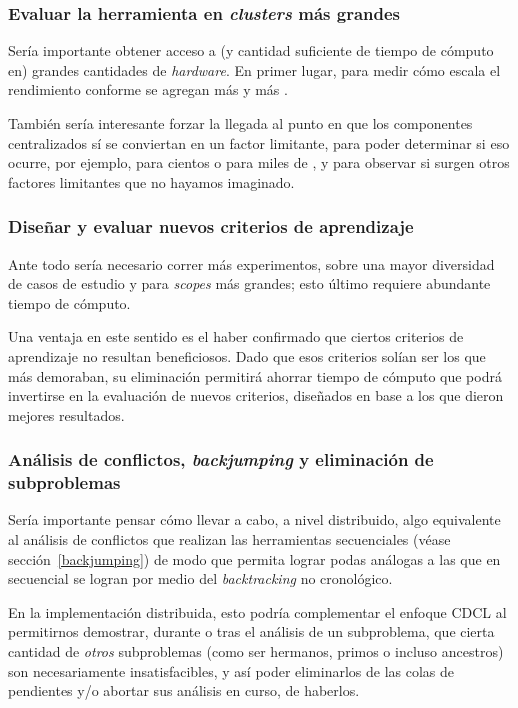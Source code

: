 \subsubsection{Evaluar la herramienta en \emph{clusters} más grandes}

Sería importante obtener acceso a (y cantidad suficiente de tiempo de cómputo en) grandes cantidades de \emph{hardware}. En primer lugar, para medir cómo escala el rendimiento conforme se agregan más y más \ws.

También sería interesante forzar la llegada al punto en que los componentes centralizados sí se conviertan en un factor limitante, para poder determinar si eso ocurre, por ejemplo, para cientos o para miles de \ws, y para observar si surgen otros factores limitantes que no hayamos imaginado.


\subsubsection{Diseñar y evaluar nuevos criterios de aprendizaje}

Ante todo sería necesario correr más experimentos, sobre una mayor diversidad de casos de estudio y para \emph{scopes} más grandes; esto último requiere abundante tiempo de cómputo.

Una ventaja en este sentido es el haber confirmado que ciertos criterios de aprendizaje no resultan beneficiosos. Dado que esos criterios solían ser los que más demoraban, su eliminación permitirá ahorrar tiempo de cómputo que podrá invertirse en la evaluación de nuevos criterios, diseñados en base a los que dieron mejores resultados.


\subsubsection{Análisis de conflictos, \emph{backjumping} y eliminación de subproblemas}

Sería importante pensar cómo llevar a cabo, a nivel distribuido, algo equivalente al análisis de conflictos que realizan las herramientas secuenciales (véase sección~\ref{backjumping}) de modo que permita lograr podas análogas a las que en secuencial se logran por medio del \emph{backtracking} no cronológico.

En la implementación distribuida, esto podría complementar el enfoque CDCL al permitirnos demostrar, durante o tras el análisis de un subproblema, que cierta cantidad de \emph{otros} subproblemas (como ser hermanos, primos o incluso ancestros) son necesariamente insatisfacibles, y así poder eliminarlos de las colas de pendientes y/o abortar sus análisis en curso, de haberlos.


